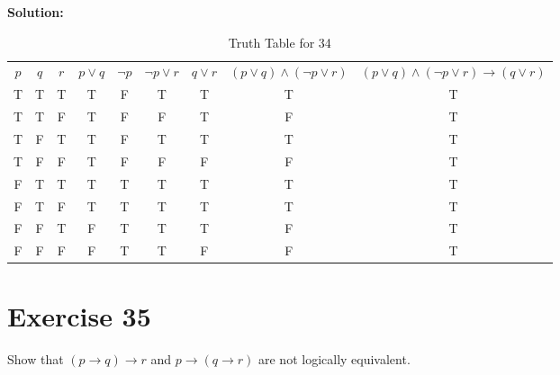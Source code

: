 \documentclass{Axon}
\begin{document}
\noindent
\textbf{Solution:}
\begin{table}[ht]
    \centering
    \begin{tabular}{c|c|c|c|c|c|c|c|c}
        \(p\) & \(q\) & \(r\) & \(p \lor q\) & \(\lnot p\) & \(\lnot p \lor r\) & \(q \lor r\) & \((p \lor q) \land (\lnot p \lor r)\) & \((p \lor q) \land (\lnot p \lor r) \to (q \lor r)\) \\
        T     & T     & T     & T            & F           & T                  & T            & T                                     & T                                                    \\
        T     & T     & F     & T            & F           & F                  & T            & F                                     & T                                                    \\
        T     & F     & T     & T            & F           & T                  & T            & T                                     & T                                                    \\
        T     & F     & F     & T            & F           & F                  & F            & F                                     & T                                                    \\
        F     & T     & T     & T            & T           & T                  & T            & T                                     & T                                                    \\
        F     & T     & F     & T            & T           & T                  & T            & T                                     & T                                                    \\
        F     & F     & T     & F            & T           & T                  & T            & F                                     & T                                                    \\
        F     & F     & F     & F            & T           & T                  & F            & F                                     & T
    \end{tabular}
    \caption{Truth Table for 34}
\end{table}

\section*{Exercise 35}
Show that \((p \to q) \to r\) and \(p \to (q \to r)\) are not logically equivalent.
\end{document}
